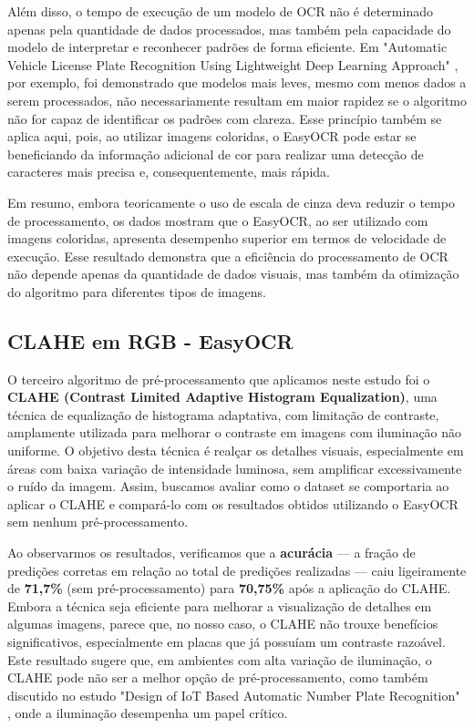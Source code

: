 \documentclass[conference]{IEEEtran}
\begin{document}
Além disso, o tempo de execução de um modelo de OCR não é determinado apenas pela quantidade de dados processados, mas também pela capacidade do modelo de interpretar e reconhecer padrões de forma eficiente. Em "Automatic Vehicle License Plate Recognition Using Lightweight Deep Learning Approach" \cite{b5}, por exemplo, foi demonstrado que modelos mais leves, mesmo com menos dados a serem processados, não necessariamente resultam em maior rapidez se o algoritmo não for capaz de identificar os padrões com clareza. Esse princípio também se aplica aqui, pois, ao utilizar imagens coloridas, o EasyOCR pode estar se beneficiando da informação adicional de cor para realizar uma detecção de caracteres mais precisa e, consequentemente, mais rápida.

Em resumo, embora teoricamente o uso de escala de cinza deva reduzir o tempo de processamento, os dados mostram que o EasyOCR, ao ser utilizado com imagens coloridas, apresenta desempenho superior em termos de velocidade de execução. Esse resultado demonstra que a eficiência do processamento de OCR não depende apenas da quantidade de dados visuais, mas também da otimização do algoritmo para diferentes tipos de imagens.



\subsection{CLAHE em RGB - EasyOCR}


O terceiro algoritmo de pré-processamento que aplicamos neste estudo foi o \textbf{CLAHE (Contrast Limited Adaptive Histogram Equalization)}, uma técnica de equalização de histograma adaptativa, com limitação de contraste, amplamente utilizada para melhorar o contraste em imagens com iluminação não uniforme. O objetivo desta técnica é realçar os detalhes visuais, especialmente em áreas com baixa variação de intensidade luminosa, sem amplificar excessivamente o ruído da imagem. Assim, buscamos avaliar como o dataset se comportaria ao aplicar o CLAHE e compará-lo com os resultados obtidos utilizando o EasyOCR sem nenhum pré-processamento.

Ao observarmos os resultados, verificamos que a \textbf{acurácia} — a fração de predições corretas em relação ao total de predições realizadas — caiu ligeiramente de \textbf{71,7\%} (sem pré-processamento) para \textbf{70,75\%} após a aplicação do CLAHE. Embora a técnica seja eficiente para melhorar a visualização de detalhes em algumas imagens, parece que, no nosso caso, o CLAHE não trouxe benefícios significativos, especialmente em placas que já possuíam um contraste razoável. Este resultado sugere que, em ambientes com alta variação de iluminação, o CLAHE pode não ser a melhor opção de pré-processamento, como também discutido no estudo "Design of IoT Based Automatic Number Plate Recognition" \cite{b10}, onde a iluminação desempenha um papel crítico.
\end{document}

